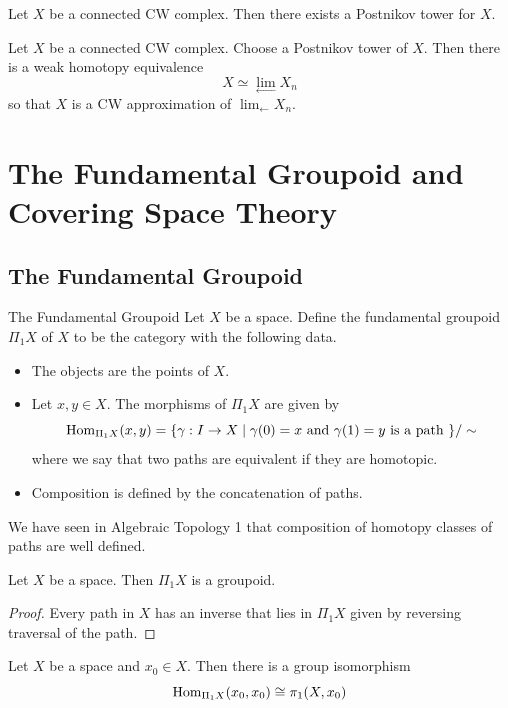 \documentclass[a4paper]{article}
\begin{document}
\begin{prp}{}{} Let $X$ be a connected CW complex. Then there exists a Postnikov tower for $X$. 
\end{prp}

\begin{prp}{}{} Let $X$ be a connected CW complex. Choose a Postnikov tower of $X$. Then there is a weak homotopy equivalence $$X\simeq\lim_{\leftarrow}X_n$$ so that $X$ is a CW approximation of $\lim_{\leftarrow}X_n$. 
\end{prp}

\pagebreak
\section{The Fundamental Groupoid and Covering Space Theory}
\subsection{The Fundamental Groupoid}
\begin{defn}{The Fundamental Groupoid}{} Let $X$ be a space. Define the fundamental groupoid $\Pi_1X$ of $X$ to be the category with the following data. 
\begin{itemize}
\item The objects are the points of $X$. 
\item Let $x,y\in X$. The morphisms of $\Pi_1X$ are given by $$\operatorname{Hom}_{\Pi_1X}(x,y)=\{\gamma:I\to X\;|\;\gamma(0)=x\text{ and }\gamma(1)=y\text{ is a path }\}/\sim$$ where we say that two paths are equivalent if they are homotopic. 
\item Composition is defined by the concatenation of paths. 
\end{itemize}
\end{defn}

We have seen in Algebraic Topology 1 that composition of homotopy classes of paths are well defined. 

\begin{lmm}{}{} Let $X$ be a space. Then $\Pi_1X$ is a groupoid. \tcbline
\begin{proof}
Every path in $X$ has an inverse that lies in $\Pi_1X$ given by reversing traversal of the path. 
\end{proof}
\end{lmm}

\begin{lmm}{}{} Let $X$ be a space and $x_0\in X$. Then there is a group isomorphism $$\operatorname{Hom}_{\Pi_1X}(x_0,x_0)\cong\pi_1(X,x_0)$$
\end{lmm}
\end{document}
